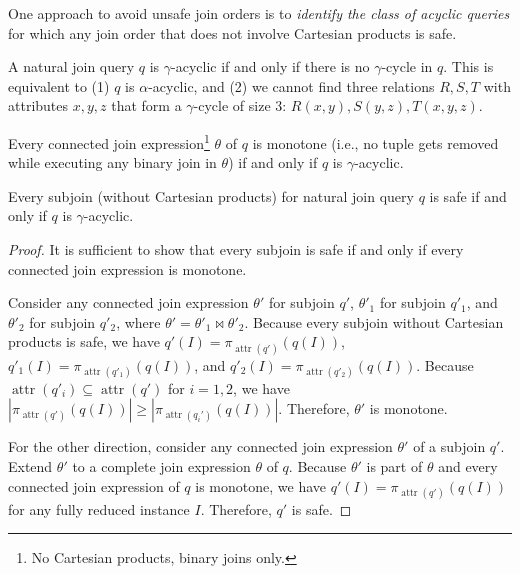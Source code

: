 One approach to avoid unsafe join orders is to \emph{identify the class of acyclic queries} for which any join order that does not involve Cartesian products is safe.

\begin{definition}\label{def:gamma}
A natural join query $q$ is $\gamma$-acyclic if and only if there is no $\gamma$-cycle in $q$. This is equivalent to (1) $q$ is $\alpha$-acyclic, and (2) we cannot find three relations $R, S, T$ with attributes $x, y, z$ that form a $\gamma$-cycle of size 3: $R(x, y), S(y, z), T(x, y, z)$.
\end{definition}

\begin{lemma}
Every connected join expression\footnote{No Cartesian products, binary joins only.} $\theta$ of $q$ is monotone (i.e., no tuple gets removed while executing any binary join in $\theta$) if and only if $q$ is $\gamma$-acyclic.
\end{lemma}

\begin{theorem}\label{thm:gamma_safe}
Every subjoin (without Cartesian products) for natural join query $q$ is safe if and only if $q$ is $\gamma$-acyclic.
\end{theorem}


\begin{proof}
    It is sufficient to show that every subjoin is safe if and only if every connected join expression is monotone.

    Consider any connected join expression $\theta'$ for subjoin $q'$, $\theta'_1$ for subjoin $q'_1$, and $\theta'_2$ for subjoin $q'_2$,
    where $\theta'=\theta'_1\Join \theta'_2$.
    Because every subjoin without Cartesian products is safe, we have
    $q'(I)=\pi_{\operatorname{attr}(q')}(q(I))$, 
    $q'_1(I)=\pi_{\operatorname{attr}(q'_1)}(q(I))$, and
    $q'_2(I)=\pi_{\operatorname{attr}(q'_2)}(q(I))$.
    Because $\operatorname{attr}(q'_i) \subseteq \operatorname{attr}(q')$ for $i = 1, 2$,
    we have $|\pi_{\operatorname{attr}(q')}(q(I))| \ge |\pi_{\operatorname{attr}(q_i')}(q(I))|$.
    Therefore, $\theta'$ is monotone.

    For the other direction,
    consider any connected join expression $\theta'$ of a subjoin $q'$.
    Extend $\theta'$ to a complete join expression $\theta$ of $q$.
    Because $\theta'$ is part of $\theta$ and every connected join expression of $q$ is monotone,
    we have $q'(I)=\pi_{\operatorname{attr}(q')}(q(I))$ for any fully reduced instance $I$.
    Therefore, $q'$ is safe.
\end{proof}

